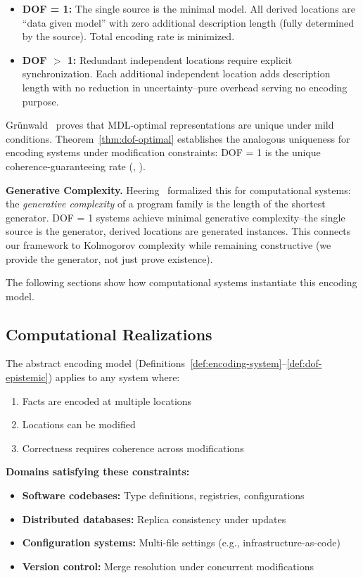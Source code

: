 \begin{itemize}
\tightlist
\item \textbf{DOF = 1:} The single source is the minimal model. All derived locations are ``data given model'' with zero additional description length (fully determined by the source). Total encoding rate is minimized.
\item \textbf{DOF $>$ 1:} Redundant independent locations require explicit synchronization. Each additional independent location adds description length with no reduction in uncertainty--pure overhead serving no encoding purpose.
\end{itemize}

Grünwald~\cite{gruenwald2007mdl} proves that MDL-optimal representations are unique under mild conditions. Theorem~\ref{thm:dof-optimal} establishes the analogous uniqueness for encoding systems under modification constraints: DOF = 1 is the unique coherence-guaranteeing rate (, ).

\textbf{Generative Complexity.} Heering~\cite{heering2015generative} formalized this for computational systems: the \emph{generative complexity} of a program family is the length of the shortest generator. DOF = 1 systems achieve minimal generative complexity--the single source is the generator, derived locations are generated instances. This connects our framework to Kolmogorov complexity while remaining constructive (we provide the generator, not just prove existence).

The following sections show how computational systems instantiate this encoding model.


\subsection{Computational Realizations}\label{sec:edit-space}

The abstract encoding model (Definitions~\ref{def:encoding-system}--\ref{def:dof-epistemic}) applies to any system where:
\begin{enumerate}
\tightlist
\item Facts are encoded at multiple locations
\item Locations can be modified
\item Correctness requires coherence across modifications
\end{enumerate}

\textbf{Domains satisfying these constraints:}
\begin{itemize}
\tightlist
\item \textbf{Software codebases:} Type definitions, registries, configurations
\item \textbf{Distributed databases:} Replica consistency under updates
\item \textbf{Configuration systems:} Multi-file settings (e.g., infrastructure-as-code)
\item \textbf{Version control:} Merge resolution under concurrent modifications
\end{itemize}

